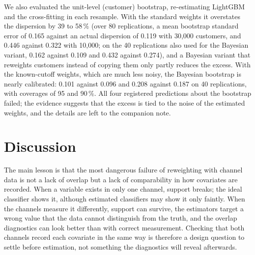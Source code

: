 \documentclass[twoside,11pt]{article}
\theoremstyle{plain}
\theoremstyle{definition}
\begin{document}
We also evaluated the unit-level (customer) bootstrap, re-estimating LightGBM and the cross-fitting in each resample. With the standard weights it overstates the dispersion by 39 to 58\,\% (over 80 replications, a mean bootstrap standard error of 0.165 against an actual dispersion of 0.119 with 30{,}000 customers, and 0.446 against 0.322 with 10{,}000; on the 40 replications also used for the Bayesian variant, 0.162 against 0.109 and 0.432 against 0.274), and a Bayesian variant that reweights customers instead of copying them only partly reduces the excess. With the known-cutoff weights, which are much less noisy, the Bayesian bootstrap is nearly calibrated: 0.101 against 0.096 and 0.208 against 0.187 on 40 replications, with coverages of 95 and 90\,\%. All four registered predictions about the bootstrap failed; the evidence suggests that the excess is tied to the noise of the estimated weights, and the details are left to the companion note.
\section{Discussion}\label{sec:discussion}

The main lesson is that the most dangerous failure of reweighting with channel data is not a lack of overlap but a lack of comparability in how covariates are recorded. When a variable exists in only one channel, support breaks; the ideal classifier shows it, although estimated classifiers may show it only faintly. When the channels measure it differently, support can survive, the estimators target a wrong value that the data cannot distinguish from the truth, and the overlap diagnostics can look better than with correct measurement. Checking that both channels record each covariate in the same way is therefore a design question to settle before estimation, not something the diagnostics will reveal afterwards.
\end{document}

